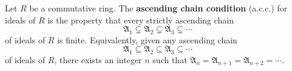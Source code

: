 Let $R$ be a commutative ring. The \textbf{ascending chain condition} (a.c.c.) for ideals of $R$ is the property that every strictly ascending chain
$$
\mathfrak{A}_1 \subsetneq \mathfrak{A}_2 \subsetneq \mathfrak{A}_3 \subsetneq \cdots
$$
of ideals of $R$ is finite. Equivalently, given any ascending chain
$$
\mathfrak{A}_1 \subseteq \mathfrak{A}_2 \subseteq \mathfrak{A}_3 \subseteq \cdots
$$
of ideals of $R$, there exists an integer $n$ such that $\mathfrak{A}_n = \mathfrak{A}_{n+1} = \mathfrak{A}_{n+2} = \cdots$.
